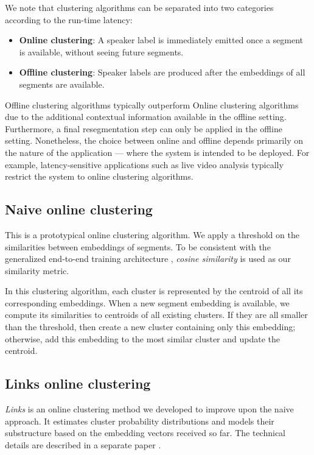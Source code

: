 \documentclass{article}
\begin{document}
We note that clustering algorithms can be separated into two categories according to the run-time latency:
\begin{itemize}
  \item {\bf Online clustering}: A speaker label is immediately emitted once a segment is available, without seeing future segments.
  \item {\bf Offline clustering}: Speaker labels are produced after the embeddings of all segments
  are available.
\end{itemize}
Offline clustering algorithms typically outperform Online clustering algorithms due to the additional contextual information available in the offline setting.
Furthermore, a final resegmentation step can only be applied in the offline setting.
Nonetheless, the choice between online and offline depends primarily on the nature of the
application --- where the system is intended to be deployed.
For example, latency-sensitive applications such as live video analysis typically restrict the system to online clustering algorithms.

\subsection{Naive online clustering}
\label{sec:naive}

This is a prototypical online clustering algorithm. We apply a
threshold on the similarities between embeddings of segments.
To be consistent with the generalized end-to-end training architecture \cite{ge2e},
\textit{cosine similarity} is used as our similarity metric.

In this clustering algorithm, each cluster is represented
by the centroid of all its corresponding embeddings. When a new segment embedding is available,
we compute its similarities to centroids of all existing clusters. If they are all smaller than
the threshold, then create a new cluster containing only this embedding;
otherwise, add this embedding to the most similar cluster and update the centroid.

\subsection{Links online clustering}
\label{sec:links}

\textit{Links} is an online clustering method we developed to improve upon the naive approach. It estimates cluster probability distributions and models their substructure based on the embedding vectors received so far. The technical details are described in a separate paper \cite{mansfield2018links}.
\end{document}
